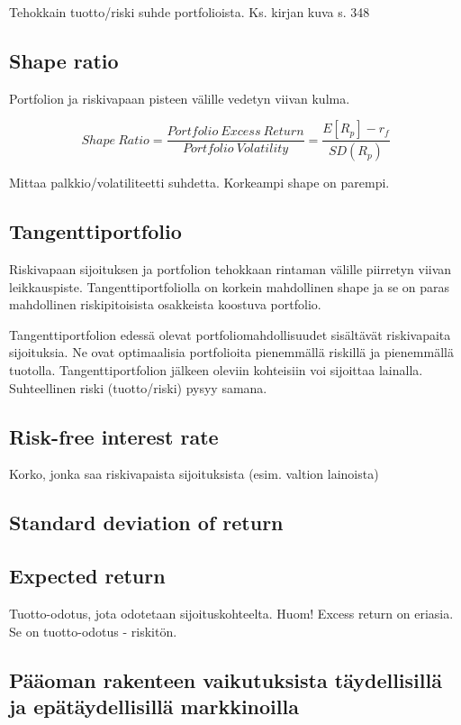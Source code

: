 \documentclass[a4paper]{article}
\begin{document}
Tehokkain tuotto/riski suhde portfolioista. Ks. kirjan kuva s. 348

\subsection{Shape ratio}

Portfolion ja riskivapaan pisteen välille vedetyn viivan kulma.

\[
    Shape\ Ratio = \frac{Portfolio\ Excess\ Return}{Portfolio\ Volatility} = \frac{E[R_p] - r_f}{SD(R_p)}
\]

Mittaa palkkio/volatiliteetti suhdetta. Korkeampi shape on parempi.

\subsection{Tangenttiportfolio}

Riskivapaan sijoituksen ja portfolion tehokkaan rintaman välille piirretyn viivan leikkauspiste. Tangenttiportfoliolla on korkein mahdollinen shape ja se on paras mahdollinen riskipitoisista osakkeista koostuva portfolio.

Tangenttiportfolion edessä olevat portfoliomahdollisuudet sisältävät riskivapaita sijoituksia. Ne ovat optimaalisia portfolioita pienemmällä riskillä ja pienemmällä tuotolla. Tangenttiportfolion jälkeen oleviin kohteisiin voi sijoittaa lainalla. Suhteellinen riski (tuotto/riski) pysyy samana.

\subsection{Risk-free interest rate}

Korko, jonka saa riskivapaista sijoituksista (esim. valtion lainoista)

\subsection{Standard deviation of return}

\subsection{Expected return}

Tuotto-odotus, jota odotetaan sijoituskohteelta. Huom! Excess return on eriasia. Se on tuotto-odotus - riskitön.

\subsection{Pääoman rakenteen vaikutuksista täydellisillä ja epätäydellisillä markkinoilla}
\end{document}
